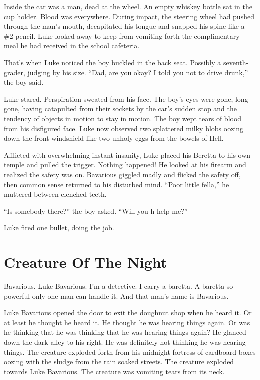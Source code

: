 Inside the car was a man, dead at the wheel. An empty whiskey
bottle sat in the cup holder. Blood was everywhere. During impact,
the steering wheel had pushed through the man's mouth,
decapitated his tongue and snapped his spine like a \#2 pencil. Luke
looked away to keep from vomiting forth the complimentary meal he
had received in the school cafeteria.



That's when Luke noticed the boy buckled in the back seat.
Possibly a seventh-grader, judging by his size. ``Dad, are you
okay? I told you not to drive drunk,'' the boy said.



Luke stared. Perspiration sweated from his face. The boy's
eyes were gone, long gone, having catapulted from their sockets by
the car's sudden stop and the tendency of objects in motion
to stay in motion. The boy wept tears of blood from his disfigured
face. Luke now observed two splattered milky blobs oozing down the
front windshield like two unholy eggs from the bowels of
Hell.



Afflicted with overwhelming instant insanity, Luke placed his
Beretta to his own temple and pulled the trigger. Nothing happened!
He looked at his firearm and realized the safety was on. Bavarious
giggled madly and flicked the safety off, then common sense
returned to his disturbed mind. ``Poor little fella,'' he
muttered between clenched teeth.



``Is somebody there?'' the boy asked. ``Will you
h-help me?''



Luke fired one bullet, doing the job. 

 





\chapter{Creature Of The Night}





Bavarious. Luke Bavarious. I'm a detective. I carry a baretta. A
baretta so powerful only one man can handle it. And that man's name
is Bavarious.



Luke Bavarious opened the door to exit the doughnut shop when he
heard it. Or at least he thought he heard it. He thought he was
hearing things again. Or was he thinking that he was thinking that
he was hearing things again? He glanced down the dark alley to his
right. He was definitely not thinking he was hearing things. The
creature exploded forth from his midnight fortress of cardboard
boxes oozing with the sludge from the rain soaked streets. The
creature exploded towards Luke Bavarious. The creature was vomiting
tears from its neck.



